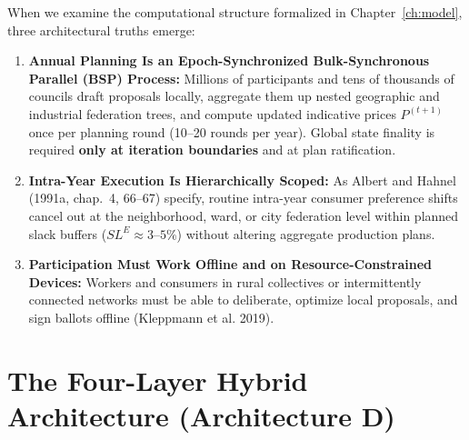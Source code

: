 \documentclass[10pt,twoside,openany]{book}
\theoremstyle{dpepstyle}
\begin{document}
When we examine the computational structure formalized in Chapter~\ref{ch:model}, three architectural truths emerge:
\begin{enumerate}[leftmargin=1.8em,itemsep=2pt]
  \item \textbf{Annual Planning Is an Epoch-Synchronized Bulk-Synchronous Parallel (BSP) Process:} Millions of participants and tens of thousands of councils draft proposals locally, aggregate them up nested geographic and industrial federation trees, and compute updated indicative prices $P^{(t+1)}$ once per planning round (10--20 rounds per year). Global state finality is required \textbf{only at iteration boundaries} and at plan ratification.
  \item \textbf{Intra-Year Execution Is Hierarchically Scoped:} As Albert and Hahnel (1991a, chap.~4, 66--67) specify, routine intra-year consumer preference shifts cancel out at the neighborhood, ward, or city federation level within planned slack buffers ($SL^E \approx 3\text{--}5\%$) without altering aggregate production plans.
  \item \textbf{Participation Must Work Offline and on Resource-Constrained Devices:} Workers and consumers in rural collectives or intermittently connected networks must be able to deliberate, optimize local proposals, and sign ballots offline (Kleppmann et al. 2019).
\end{enumerate}

\section{The Four-Layer Hybrid Architecture (Architecture D)}
\label{sec:arch-d}
\end{document}
